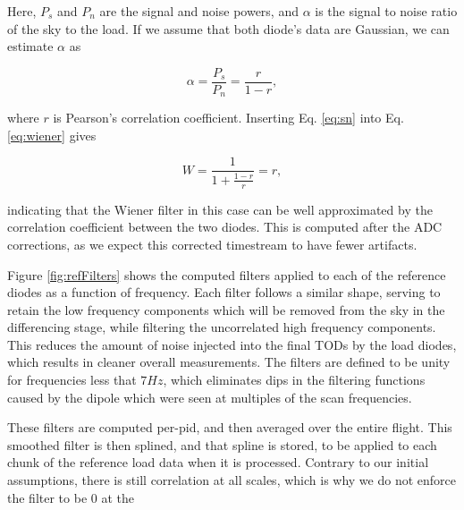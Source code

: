 \documentclass[twocolumn]{aa}
\begin{document}
Here, $P_s$ and $P_n$ are the signal and noise powers, and $\alpha$ is the signal to noise ratio of the sky to the load. If we assume that both diode's data are Gaussian, we can estimate $\alpha$ as

\begin{equation}
\label{eq:sn}
\alpha = \frac{P_s}{P_n} = \frac{r}{1-r},
\end{equation}

where $r$ is Pearson's correlation coefficient. Inserting Eq. \ref{eq:sn} into Eq. \ref{eq:wiener} gives

\begin{equation}
W = \frac{1}{1 + \frac{1-r}{r}} = r,
\end{equation}

indicating that the Wiener filter in this case can be well approximated by the correlation coefficient between the two diodes. This is computed after the ADC corrections, as we expect this corrected timestream to have fewer artifacts. 

Figure \ref{fig:refFilters} shows the computed filters applied to each of the reference diodes as a function of frequency. Each filter follows a similar shape, serving to retain the low frequency components which will be removed from the sky in the differencing stage, while filtering the uncorrelated high frequency components. This reduces the amount of noise injected into the final TODs by the load diodes, which results in cleaner overall measurements. The filters are defined to be unity for frequencies less that $7 Hz$, which eliminates dips in the filtering functions caused by the dipole which were seen at multiples of the scan frequencies.

These filters are computed per-pid, and then averaged over the entire flight. This smoothed filter is then splined, and that spline is stored, to be applied to each chunk of the reference load data when it is processed. Contrary to our initial assumptions, there is still correlation at all scales, which is why we do not enforce the filter to be 0 at the 
\end{document}
